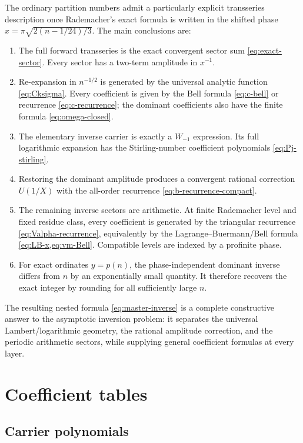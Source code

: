 \documentclass[11pt,a4paper]{article}
\numberwithin{equation}{section}
\theoremstyle{remark}
\begin{document}
The ordinary partition numbers admit a particularly explicit transseries description once Rademacher's exact formula is written in the shifted phase $x=\pi\sqrt{2(n-1/24)/3}$.  The main conclusions are:

\begin{enumerate}
\item The full forward transseries is the exact convergent sector sum \cref{eq:exact-sector}.  Every sector has a two-term amplitude in $x^{-1}$.
\item Re-expansion in $n^{-1/2}$ is generated by the universal analytic function \cref{eq:Cksigma}.  Every coefficient is given by the Bell formula \cref{eq:c-bell} or recurrence \cref{eq:c-recurrence}; the dominant coefficients also have the finite formula \cref{eq:omega-closed}.
\item The elementary inverse carrier is exactly a $W_{-1}$ expression.  Its full logarithmic expansion has the Stirling-number coefficient polynomials \cref{eq:Pj-stirling}.
\item Restoring the dominant amplitude produces a convergent rational correction $U(1/X)$ with the all-order recurrence \cref{eq:b-recurrence-compact}.
\item The remaining inverse sectors are arithmetic.  At finite Rademacher level and fixed residue class, every coefficient is generated by the triangular recurrence \cref{eq:Valpha-recurrence}, equivalently by the Lagrange--Buer\-mann/Bell formula \cref{eq:LB-x,eq:vm-Bell}.  Compatible levels are indexed by a profinite phase.
\item For exact ordinates $y=p(n)$, the phase-independent dominant inverse differs from $n$ by an exponentially small quantity.  It therefore recovers the exact integer by rounding for all sufficiently large $n$.
\end{enumerate}

The resulting nested formula \cref{eq:master-inverse} is a complete constructive answer to the asymptotic inversion problem: it separates the universal Lambert/logarithmic geometry, the rational amplitude correction, and the periodic arithmetic sectors, while supplying general coefficient formulas at every layer.

\appendix

\section{Coefficient tables}\label{app:tables}

\subsection{Carrier polynomials}
\end{document}
